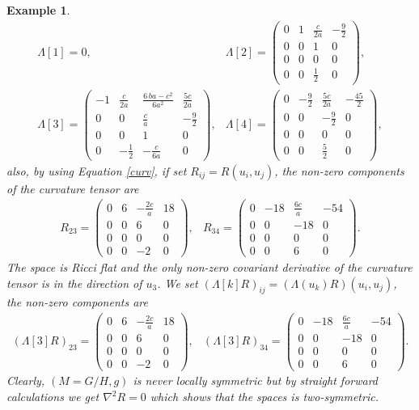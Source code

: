 \documentclass[11pt,oneside,leqno]{amsart}
\theoremstyle{plain}
\newtheorem{ex}[theorem]{Example}
\begin{document}
\begin{ex}
$$
\begin{array}{ll}
\Lambda[1]=0,&\Lambda[2]=\left( \begin {array}{cccc} 0&1&{\frac {c}{2a}}&-\frac 92
\\ 0&0&1&0\\ 0&0&0&0
\\ 0&0&\frac 12&0\end {array} \right),\\
\Lambda[3]= \left( \begin {array}{cccc} -1&{\frac {c}{2a}}&{\frac {6\,ba
-{c}^{2}}{6{a}^{2}}}&{\frac {5c}{2a}}\\[4pt] 0&0&{
\frac {c}{a}}&-\frac 92\\ 0&0&1&0\\ 0&-
\frac 12&-{\frac {c}{6a}}&0\end {array} \right),&
\Lambda[4]=\left( \begin {array}{cccc} 0&-\frac 92&{\frac {5c}{2a}}&-{\frac {45}{2
}}\\[4pt] 0&0&-\frac 92&0\\ 0&0&0&0
\\ 0&0&\frac 52&0\end {array} \right),
\end{array}
$$
also, by using Equation \eqref{curv}, if set $R_{ij}=R(u_i,u_j)$, the non-zero components of the curvature tensor are
$$
\begin{array}{ll}
R_{23}=\left( \begin {array}{cccc} 0&6&-{\frac {2c}{a}}&18
\\ 0&0&6&0\\ 0&0&0&0
\\ 0&0&-2&0\end {array} \right),&
R_{34}=\left( \begin {array}{cccc} 0&-18&{\frac {6c}{a}}&-54
\\ 0&0&-18&0\\ 0&0&0&0
\\ 0&0&6&0\end {array} \right).
\end{array}
$$
The space is Ricci flat and the only non-zero covariant derivative of the curvature tensor is in the direction of $u_3$. We set $(\Lambda[k]R)_{ij}=(\Lambda(u_k)R)(u_i,u_j)$, the non-zero components are
$$
\begin{array}{ll}
(\Lambda[3]R)_{23}=\left( \begin {array}{cccc} 0&6&-{\frac {2c}{a}}&18
\\ 0&0&6&0\\ 0&0&0&0
\\ 0&0&-2&0\end {array} \right),&
(\Lambda[3]R)_{34}=\left( \begin {array}{cccc} 0&-18&{\frac {6c}{a}}&-54
\\ 0&0&-18&0\\ 0&0&0&0
\\ 0&0&6&0\end {array} \right).
\end{array}
$$
Clearly, $(M=G/H,g)$ is never locally symmetric but by straight forward calculations we get $\nabla^2R=0$ which shows that the spaces is two-symmetric.
\end{ex}
\end{document}
